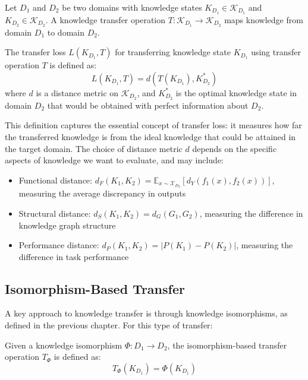 \begin{definition}
Let $D_1$ and $D_2$ be two domains with knowledge states $K_{D_1} \in \mathcal{K}_{D_1}$ and $K_{D_2} \in \mathcal{K}_{D_2}$. A knowledge transfer operation $T: \mathcal{K}_{D_1} \to \mathcal{K}_{D_2}$ maps knowledge from domain $D_1$ to domain $D_2$.
\end{definition}

\begin{definition}
The transfer loss $L(K_{D_1}, T)$ for transferring knowledge state $K_{D_1}$ using transfer operation $T$ is defined as:
\begin{equation}
L(K_{D_1}, T) = d(T(K_{D_1}), K_{D_2}^*)
\end{equation}
where $d$ is a distance metric on $\mathcal{K}_{D_2}$, and $K_{D_2}^*$ is the optimal knowledge state in domain $D_2$ that would be obtained with perfect information about $D_2$.
\end{definition}

This definition captures the essential concept of transfer loss: it measures how far the transferred knowledge is from the ideal knowledge that could be attained in the target domain. The choice of distance metric $d$ depends on the specific aspects of knowledge we want to evaluate, and may include:

\begin{itemize}
    \item Functional distance: $d_F(K_1, K_2) = \mathbb{E}_{x \sim \mathcal{X}_{D_2}}[d_Y(f_1(x), f_2(x))]$, measuring the average discrepancy in outputs
    \item Structural distance: $d_S(K_1, K_2) = d_G(G_1, G_2)$, measuring the difference in knowledge graph structure
    \item Performance distance: $d_P(K_1, K_2) = |P(K_1) - P(K_2)|$, measuring the difference in task performance
\end{itemize}

\subsection{Isomorphism-Based Transfer}

A key approach to knowledge transfer is through knowledge isomorphisms, as defined in the previous chapter. For this type of transfer:

\begin{definition}
Given a knowledge isomorphism $\Phi: D_1 \to D_2$, the isomorphism-based transfer operation $T_{\Phi}$ is defined as:
\begin{equation}
T_{\Phi}(K_{D_1}) = \Phi(K_{D_1})
\end{equation}
\end{definition}

